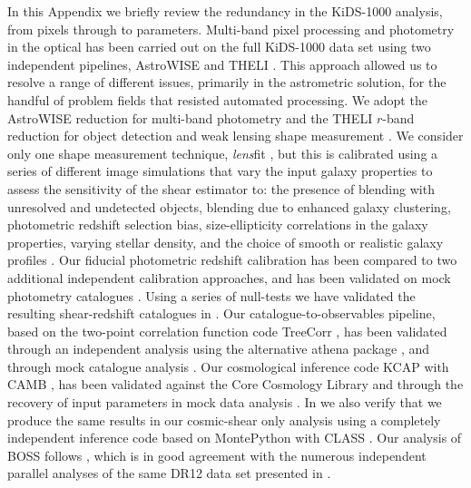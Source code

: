 \begin{appendix}
In this Appendix we briefly review the redundancy in the KiDS-1000 analysis, from pixels through to parameters.   Multi-band pixel processing and photometry in the optical has been carried out on the full KiDS-1000 data set using two independent pipelines, {\sc AstroWISE} and {\sc THELI} \citep{begeman/etal:2013, erben/etal:2013}.  This approach allowed us to resolve a range of different issues, primarily in the astrometric solution, for the handful of problem fields that resisted automated processing.  We adopt the {\sc AstroWISE} reduction for multi-band photometry and the {\sc THELI} $r$-band reduction for object detection and weak lensing shape measurement \citep{kuijken/etal:2019}.  We consider only one shape measurement technique, {\it lens}fit \citep{miller/etal:2013}, but this is calibrated using a series of different image simulations that vary the input galaxy properties to assess the sensitivity of the shear estimator to: the presence of blending with unresolved and undetected objects, blending due to enhanced galaxy clustering, photometric redshift selection bias, size-ellipticity correlations in the galaxy properties, varying stellar density, and the choice of smooth or realistic galaxy profiles \citep[see][for details]{kannawadi/etal:2019, giblin/etal:inprep}.  Our fiducial photometric redshift calibration has been compared to two additional independent calibration approaches, and has been validated on mock photometry catalogues \citep[see][for details]{wright/etal:2020, vandenbusch/etal:2020, hildebrandt/etal:inprep}.   Using a series of null-tests we have validated the resulting shear-redshift catalogues in \citet{giblin/etal:inprep}.    Our catalogue-to-observables pipeline, based on the two-point correlation function code {\sc TreeCorr} \citep{treecorr}, has been validated through an independent analysis using the alternative {\sc athena} package \citep{athena}, and through mock catalogue analysis \citep{joachimi/etal:inprep}.   Our cosmological inference code {\sc KCAP} with {\sc CAMB} \citep{lewis/etal:2000}, has been validated against the Core Cosmology Library \citep[CCL,][]{chisari/etal:2019} and through the recovery of input parameters in mock data analysis \citep{joachimi/etal:inprep}.  In \citet{asgari/etal:inprep} we also verify that we produce the same results in our cosmic-shear only analysis using a completely independent inference code based on {\sc MontePython} with {\sc CLASS} \citep{class, montepython, kohlinger/etal:2019,hildebrandt/etal:2020}.   Our analysis of BOSS follows \citet{sanchez/etal:2017}, which is in good agreement with the numerous independent parallel analyses of the same DR12 data set presented in \citet{alam/etal:2017}.



\end{appendix}
